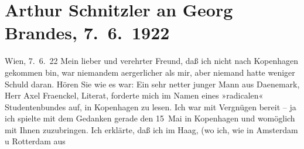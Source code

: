 

         
         \renewcommand{\erwaehntePersonen}{Personen: Georg Brandes, Axel Fraenckel, Heinrich Schnitzler, Lili Schnitzler, Olga Schnitzler}
         \renewcommand{\erwaehnteOrte}{Orte: Amsterdam, Athen, Berlin, Den Haag, Dänemark, Graz, Griechenland, Kopenhagen, München, Niederlande, Nürnberg, Raimund-Theater, Rotterdam, Universität Wien, Völser Weiher, Wien}
         \renewcommand{\erwaehnteWerke}{Werke: Das weite Land. Tragikomödie in fünf Akten, Komödie der Verführung. In drei Akten}
               \section[Arthur Schnitzler an Georg Brandes, 7. 6. 1922]{ Arthur Schnitzler an Georg Brandes, 7. 6. 1922}\nopagebreak{}\rehead{ }\begin{ledgroupsized}[t]{13cm}\normalsize\beginnumbering \toendnotes[C]{\smallbreak\pagebreak[2]} 
\toendnotes[C]{\smallbreak}\pstart
           \raggedleft{}{\pb}Wien, 7. 6. 22\pend
           \pstart
           Mein lieber und verehrter Freund, daß ich nicht nach Kopenhagen gekommen bin, war niemandem
               aergerlicher als mir, aber niemand hatte weniger Schuld daran. Hören Sie wie es war:
               Ein sehr netter junger Mann aus Daenemark, Herr
                  Axel Fraenckel, Literat, forderte mich im
               Namen eines »radicalen« Studentenbundes auf, in Kopenhagen zu lesen. Ich war mit Vergnügen bereit – ja ich spielte mit dem
               Gedanken gerade den 15 Mai in Kopenhagen und womöglich mit Ihnen zuzubringen. Ich erklärte, daß ich im Haag, (wo ich, wie in Amsterdam u Rotterdam aus

\end{ledgroupsized}
